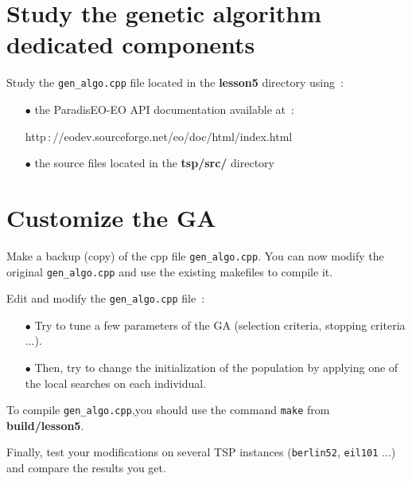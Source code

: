 \documentclass[a4paper]{article}
\begin{document}
\section{Study the genetic algorithm dedicated components}

    Study the {\tt gen\_algo.cpp} file located in the {\bf lesson5} directory
    using~:
    \begin{itemize}
       \item[$\bullet$] the ParadisEO-EO API documentation available at~:

       \hspace{1cm}http$\,:$//eodev.sourceforge.net/eo/doc/html/index.html

       \item[$\bullet$] the source files located in the {\bf tsp/src/} directory
    \end{itemize}


\section{Customize the GA}

    Make a backup (copy) of the cpp file {\tt gen\_algo.cpp}. You can now modify the
    original {\tt gen\_algo.cpp} and use the existing makefiles to compile it.

    Edit and modify the {\tt gen\_algo.cpp} file~:
    \begin{itemize}
       \item[$\bullet$] Try to tune a few parameters of the GA
       (selection criteria, stopping criteria ...).
       \item[$\bullet$] Then, try to change the initialization of the population
       by applying one of the local searches on each individual.
    \end{itemize}

    \smallskip
    To compile {\tt gen\_algo.cpp},you should use the
    command {\tt make} from {\bf build/lesson5}.

    \medskip
    Finally, test your modifications on several TSP instances ({\tt berlin52},
    {\tt eil101} ...) and compare the results you get.
\end{document}
